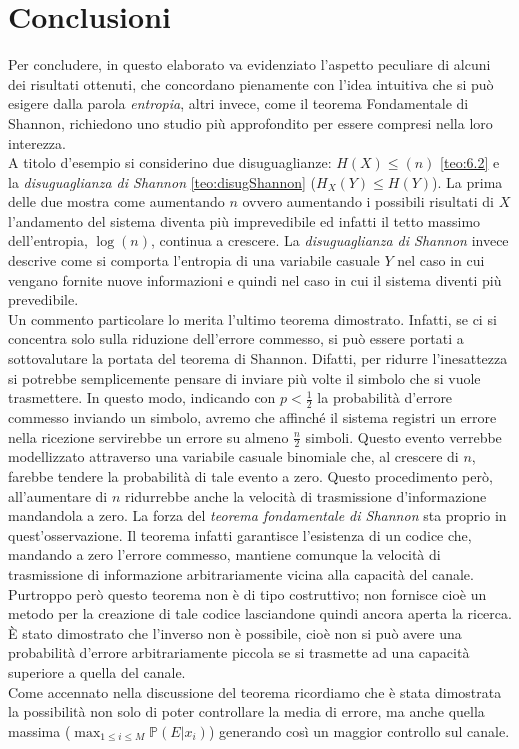 \chapter{Conclusioni}
\label{cha:conclusioni}
\vspace{15pt}

Per concludere, in questo elaborato va evidenziato l'aspetto peculiare di alcuni dei risultati ottenuti, che concordano pienamente con l'idea intuitiva che si può esigere dalla parola \textit{entropia}, altri invece, come il teorema Fondamentale di Shannon, richiedono uno studio più approfondito per essere compresi nella loro interezza.\\
A titolo d'esempio si considerino due disuguaglianze: $H(X)\leq(n)$ \ref{teo:6.2} e la \textit{disuguaglianza di Shannon} \ref{teo:disugShannon} ($H_X(Y)\leq H(Y)$). La prima delle due mostra come aumentando $n$ ovvero aumentando i possibili risultati di $X$ l'andamento  del sistema diventa più imprevedibile ed infatti il tetto massimo dell'entropia, $\log(n)$, continua a crescere. La \textit{disuguaglianza di Shannon} invece descrive come si comporta l'entropia di una variabile casuale $Y$ nel caso in cui vengano fornite nuove informazioni e quindi nel caso in cui il sistema diventi più prevedibile.\\ 
Un commento particolare lo merita l'ultimo teorema dimostrato. Infatti, se ci si concentra solo sulla riduzione dell'errore commesso, si può essere portati a sottovalutare la portata del teorema di Shannon. Difatti, per ridurre l'inesattezza si potrebbe semplicemente pensare di inviare più volte il simbolo che si vuole trasmettere. In questo modo, indicando con $p<\frac{1}{2}$ la probabilità d'errore commesso inviando un simbolo, avremo che affinché il sistema registri un errore nella ricezione servirebbe un errore su almeno $\frac{n}{2}$ simboli. Questo evento verrebbe modellizzato attraverso una variabile casuale binomiale che, al crescere di $n$, farebbe tendere la probabilità di tale evento a zero. Questo procedimento però, all'aumentare di $n$ ridurrebbe anche la velocità di trasmissione d'informazione mandandola a zero. La forza del \textit{teorema fondamentale di Shannon} sta proprio in quest'osservazione. Il teorema infatti garantisce l'esistenza di un codice che, mandando a zero l'errore commesso, mantiene comunque la velocità di trasmissione di informazione arbitrariamente vicina alla capacità del canale. Purtroppo però questo teorema non è di tipo costruttivo; non fornisce cioè un metodo per la creazione di tale codice lasciandone quindi ancora aperta la ricerca.\\
È stato dimostrato che l'inverso non è possibile, cioè non si può avere una probabilità d'errore arbitrariamente piccola se si trasmette ad una capacità superiore a quella del canale.\\
Come accennato nella discussione del teorema ricordiamo che  è stata dimostrata la possibilità non solo di poter controllare la media di errore, ma anche quella massima ($\max_{1\leq i \leq M} \mathbb{P}(E|x_i)$) generando così un maggior controllo sul canale.








